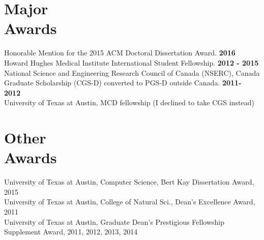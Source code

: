 \documentclass[margin,line,letterpaper]{resume}
\begin{document}
\begin{resume}
    \section{\mysidestyle Major \\Awards}
    Honorable Mention for the 2015 ACM Doctoral Dissertation Award.\hfill \textbf{ 2016}\vspace{2mm}\\
     Howard Hughes Medical Institute International Student Fellowship. \hfill \textbf{ 2012 - 2015}\vspace{2mm}
     \\ National Science and Engineering Research Council of Canada (NSERC), 
     Canada Graduate Scholarship (CGS-D) converted to PGS-D outside Canada. \hfill \textbf{2011- 2012} \vspace{2mm}
     \\ University of Texas at Austin, MCD fellowship (I declined to take CGS instead) 
     
     \section {\mysidestyle Other \\Awards}
     University of Texas at Austin, Computer Science, Bert Kay Dissertation Award, 2015\vspace{2mm}\\
     University of Texas at Austin, College of Natural Sci., Dean's Excellence Award, 2011\vspace{2mm}\\
     University of Texas at Austin, Graduate Dean's Prestigious Fellowship Supplement Award, 2011, 2012, 2013, 2014 \vspace{2mm}
    
    
    

\end{resume}
\end{document}
